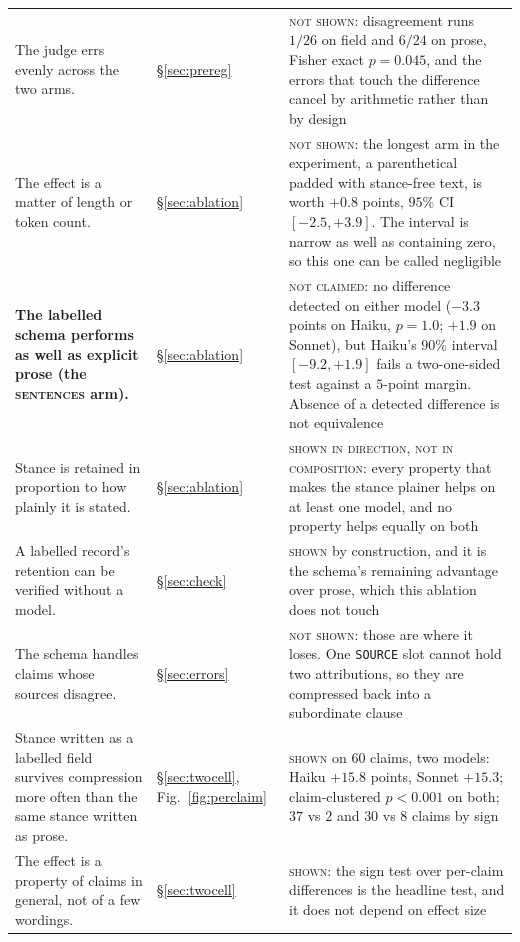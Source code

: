 \documentclass[11pt]{article}
\begin{document}
{\begin{longtable}{@{}L{0.46\textwidth} L{0.18\textwidth} L{0.28\textwidth}@{}}
The judge errs evenly across the two arms. & \S\ref{sec:prereg} & \textsc{not shown}:
disagreement runs $1/26$ on field and $6/24$ on prose, Fisher exact $p=0.045$, and the
errors that touch the difference cancel by arithmetic rather than by design \\

The effect is a matter of length or token count. & \S\ref{sec:ablation} &
\textsc{not shown}: the longest arm in the experiment, a parenthetical padded with
stance-free text, is worth $+0.8$ points, $95\%$ CI $[-2.5,+3.9]$. The interval is narrow
as well as containing zero, so this one can be called negligible \\

\textbf{The labelled schema performs as well as explicit prose (the \textsc{sentences}
arm).} &
\S\ref{sec:ablation} & \textsc{not claimed}: no difference detected on either model
($-3.3$ points on Haiku, $p=1.0$; $+1.9$ on Sonnet), but Haiku's $90\%$ interval
$[-9.2,+1.9]$ fails a two-one-sided test against a $5$-point margin. Absence of a detected
difference is not equivalence \\

Stance is retained in proportion to how plainly it is stated. & \S\ref{sec:ablation} &
\textsc{shown in direction, not in composition}: every property that makes the stance
plainer helps on at least one model, and no property helps equally on both \\


A labelled record's retention can be verified without a model. & \S\ref{sec:check} &
\textsc{shown} by construction, and it is the schema's remaining advantage over prose,
which this ablation does not touch \\

The schema handles claims whose sources disagree. & \S\ref{sec:errors} &
\textsc{not shown}: those are where it loses. One \texttt{SOURCE} slot cannot hold two
attributions, so they are compressed back into a subordinate clause \\

Stance written as a labelled field survives compression more often than the same stance
written as prose. & \S\ref{sec:twocell}, Fig.~\ref{fig:perclaim} & \textsc{shown} on
$60$ claims, two models: Haiku $+15.8$ points, Sonnet $+15.3$; claim-clustered
$p<0.001$ on both; $37$ vs $2$ and $30$ vs $8$ claims by sign \\

The effect is a property of claims in general, not of a few wordings. &
\S\ref{sec:twocell} & \textsc{shown}: the sign test over per-claim differences is the
headline test, and it does not depend on effect size \\


\end{longtable}}
\end{document}
